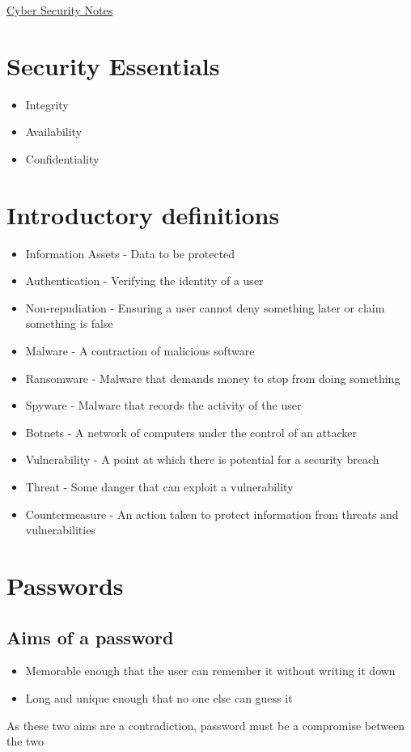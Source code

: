 \documentclass{article}[18pt]
\begin{document}
\begin{center}
\underline{\huge Cyber Security Notes}
\end{center}
\section{Security Essentials}
\begin{itemize}
\item Integrity
\item Availability 
\item Confidentiality 
\end{itemize}
\section{Introductory definitions}
\begin{itemize}
\item Information Assets - Data to be protected
\item Authentication - Verifying the identity of a user
\item Non-repudiation - Ensuring a user cannot deny something later or claim something is false
\item Malware - A contraction of malicious software
\item Ransomware - Malware that demands money to stop from doing something
\item Spyware - Malware that records the activity of the user
\item Botnets - A network of computers under the control of an attacker
\item Vulnerability - A point at which there is potential for a security breach
\item Threat - Some danger that can exploit a vulnerability
\item Countermeasure - An action taken to protect information from threats and vulnerabilities
\end{itemize}
\section{Passwords}
\subsection{Aims of a password}
\begin{itemize}
\item Memorable enough that the user can remember it without writing it down
\item Long and unique enough that no one else can guess it
\end{itemize}
As these two aims are a contradiction, password must be a compromise between the two
\end{document}
